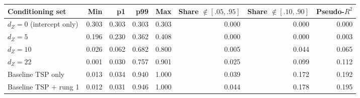 \begin{tabular}{lrrrrrrr}
\toprule
Conditioning set & Min & p1 & p99 & Max & Share $\notin[.05,.95]$ & Share $\notin[.10,.90]$ & Pseudo-$R^2$ \\
\midrule
$d_Z = 0$ (intercept only) & 0.303 & 0.303 & 0.303 & 0.303 & 0.000 & 0.000 & 0.000 \\
$d_Z = 5$ & 0.196 & 0.230 & 0.362 & 0.408 & 0.000 & 0.000 & 0.003 \\
$d_Z = 10$ & 0.026 & 0.062 & 0.682 & 0.800 & 0.005 & 0.044 & 0.065 \\
$d_Z = 22$ & 0.001 & 0.030 & 0.757 & 0.901 & 0.025 & 0.099 & 0.112 \\
Baseline TSP only & 0.013 & 0.034 & 0.940 & 1.000 & 0.039 & 0.172 & 0.192 \\
Baseline TSP $+$ rung 1 & 0.012 & 0.031 & 0.946 & 1.000 & 0.044 & 0.178 & 0.195 \\
\bottomrule
\end{tabular}
